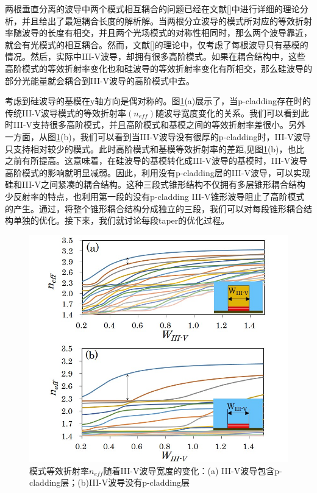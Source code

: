 两根垂直分离的波导中两个模式相互耦合的问题已经在文献[]中进行详细的理论分析，并且给出了最短耦合长度的解析解。当两根分立波导的模式所对应的等效折射率随波导的长度有相交，并且两个光场模式的对称性相同时，那么两个波导靠近，就会有光模式的相互耦合。然而，文献[]的理论中，仅考虑了每根波导只有基模的情况。然后，实际中III-V波导，却拥有很多高阶模式。如果在耦合结构中，这些高阶模式的等效折射率变化也和硅波导的等效折射率变化有所相交，那么硅波导的部分光能量就会耦合到III-V波导的高阶模式中去。

考虑到硅波导的基模在y轴方向是偶对称的。图\ref{fig_ch3_multimode}(a)展示了，当p-cladding存在时的传统III-V波导模式的等效折射率$(n_{eff})$随波导宽度变化的关系。我们可以看到此时III-V支持很多高阶模式，并且高阶模式和基模之间的等效折射率差很小。另外一方面，从图\ref{fig_ch3_multimode}(b)，我们可以看到当III-V波导没有很厚的p-cladding时，III-V波导只支持相对较少的模式。此时高阶模式和基模等效折射率的差距,见图\ref{fig_ch3_multimode}(b)，也比之前有所提高。这意味着，在硅波导的基模转化成III-V波导的基模时，III-V波导高阶模式的影响就明显减弱。因此，利用没有p-cladding层的III-V波导，可以实现硅和III-V之间紧凑的耦合结构。这种三段式锥形结构不仅拥有多层锥形耦合结构少反射率的特点\cite{kurczveil2013characterization}，也利用第一段的没有p-cladding III-V锥形波导阻止了高阶模式的产生。通过，将整个锥形耦合结构分成独立的三段，我们可以对每段锥形耦合结构单独的优化。接下来，我们就讨论每段taper的优化过程。

\begin{figure}[htb]
	\centering
	\includegraphics[width=12cm]{./Pictures/fig_ch3_multimode.jpg}
	\caption{模式等效折射率$n_{eff}$随着III-V波导宽度的变化：(a) III-V波导包含p-cladding层；(b)III-V波导没有p-cladding层}
	\label{fig_ch3_multimode}
\end{figure}

